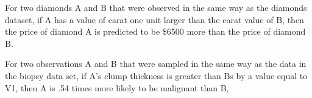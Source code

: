\documentclass[12pt]{article}
\begin{document}
\begin{enumerate}

For two diamonds A and B that were observed in the same way as the diamonds dataset, if A has a value of carat one unit larger than the carat value of B, then the price of diamond A is predicted to be \$6500 more than the price of diamond B.


For two observations A and B that were sampled in the same way as the data in the biopsy data set, if A's clump thickness is greater than Bs by a value equal to V1, then A is .54 times more likely to be malignant than B,

\end{enumerate}
\end{document}
